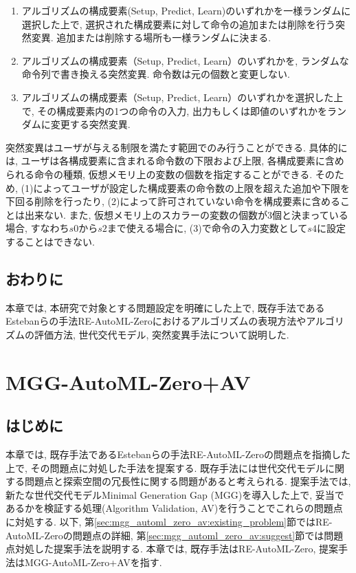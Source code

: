\documentclass[11pt,oneside,openany,report]{jsbook}
\begin{document}
\begin{enumerate}
  \renewcommand{\labelenumi}{(\arabic{enumi})}
  \item アルゴリズムの構成要素(Setup, Predict, Learn)のいずれかを一様ランダムに選択した上で, 選択された構成要素に対して命令の追加または削除を行う突然変異. 追加または削除する場所も一様ランダムに決まる.
  \item アルゴリズムの構成要素（Setup, Predict, Learn）のいずれかを, ランダムな命令列で書き換える突然変異. 命令数は元の個数と変更しない.
  \item アルゴリズムの構成要素（Setup, Predict, Learn）のいずれかを選択した上で, その構成要素内の1つの命令の入力, 出力もしくは即値のいずれかをランダムに変更する突然変異.
\end{enumerate}
\noindent
突然変異はユーザが与える制限を満たす範囲でのみ行うことができる. 具体的には, ユーザは各構成要素に含まれる命令数の下限および上限, 各構成要素に含められる命令の種類, 仮想メモリ上の変数の個数を指定することができる. そのため, (1)によってユーザが設定した構成要素の命令数の上限を超えた追加や下限を下回る削除を行ったり, (2)によって許可されていない命令を構成要素に含めることは出来ない. また, 仮想メモリ上のスカラーの変数の個数が3個と決まっている場合, すなわち$s0$から$s2$まで使える場合に, (3)で命令の入力変数として$s4$に設定することはできない.

\section{おわりに}\label{sec:problem:con}
本章では, 本研究で対象とする問題設定を明確にした上で, 既存手法であるEstebanらの手法RE-AutoML-Zeroにおけるアルゴリズムの表現方法やアルゴリズムの評価方法, 世代交代モデル, 突然変異手法について説明した.

\chapter{MGG-AutoML-Zero+AV}\label{chap:mgg_automl_zero_av}

\section{はじめに}\label{sec:mgg_automl_zero_av:intr}

本章では, 既存手法であるEstebanらの手法RE-AutoML-Zeroの問題点を指摘した上で, その問題点に対処した手法を提案する. 既存手法には世代交代モデルに関する問題点と探索空間の冗長性に関する問題があると考えられる.  提案手法では, 新たな世代交代モデルMinimal Generation Gap (MGG)を導入した上で, 妥当であるかを検証する処理(Algorithm Validation, AV)を行うことでこれらの問題点に対処する.  以下, 第\ref{sec:mgg_automl_zero_av:existing_problem}節ではRE-AutoML-Zeroの問題点の詳細, 第\ref{sec:mgg_automl_zero_av:suggest}節では問題点対処した提案手法を説明する.  本章では, 既存手法はRE-AutoML-Zero, 提案手法はMGG-AutoML-Zero+AVを指す.
\end{document}
